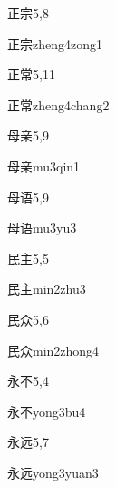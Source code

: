 \begin{entry}{正宗}{5,8}
  \begin{phonetics}{正宗}{zheng4zong1}
  \end{phonetics}
\end{entry}

\begin{entry}{正常}{5,11}
  \begin{phonetics}{正常}{zheng4chang2}
  \end{phonetics}
\end{entry}

\begin{entry}{母亲}{5,9}
  \begin{phonetics}{母亲}{mu3qin1}
  \end{phonetics}
\end{entry}

\begin{entry}{母语}{5,9}
  \begin{phonetics}{母语}{mu3yu3}
  \end{phonetics}
\end{entry}

\begin{entry}{民主}{5,5}
  \begin{phonetics}{民主}{min2zhu3}
  \end{phonetics}
\end{entry}

\begin{entry}{民众}{5,6}
  \begin{phonetics}{民众}{min2zhong4}
  \end{phonetics}
\end{entry}

\begin{entry}{永不}{5,4}
  \begin{phonetics}{永不}{yong3bu4}
  \end{phonetics}
\end{entry}

\begin{entry}{永远}{5,7}
  \begin{phonetics}{永远}{yong3yuan3}
  \end{phonetics}
\end{entry}

